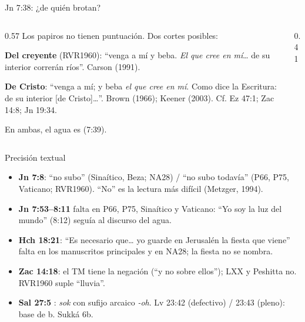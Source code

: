 \begin{frame}{Jn 7:38: ¿de quién brotan?}
\begin{columns}[c,onlytextwidth]
\begin{column}{0.57\textwidth}\scriptsize
Los papiros no tienen puntuación. Dos cortes posibles:\par\smallskip
\begin{tcolorbox}[colback=papiro,colframe=tierraroja!60,boxrule=0.6pt,arc=2pt,left=3pt,right=3pt,top=2pt,bottom=2pt]
\textbf{Del creyente} (RVR1960): ``venga a mí y beba. \emph{El que cree en mí}\ldots{} de su interior correrán ríos''. Carson (1991).
\end{tcolorbox}
\begin{tcolorbox}[colback=papiro,colframe=tierraroja!60,boxrule=0.6pt,arc=2pt,left=3pt,right=3pt,top=2pt,bottom=2pt]
\textbf{De Cristo}: ``venga a mí; y beba \emph{el que cree en mí}. Como dice la Escritura: de su interior [de Cristo]\ldots''. Brown (1966); Keener (2003). Cf. Ez 47:1; Zac 14:8; Jn 19:34.
\end{tcolorbox}
En ambas, el agua es  (7:39).
\end{column}
\begin{column}{0.41\textwidth}\end{column}
\end{columns}
\end{frame}

\begin{frame}{Precisión textual}
\small
\begin{itemize}
\item \textbf{Jn 7:8}:  ``no subo'' (Sinaítico, Beza; NA28) /  ``no subo todavía'' (P66, P75, Vaticano; RVR1960). ``No'' es la lectura más difícil (Metzger, 1994).
\item \textbf{Jn 7:53--8:11} falta en P66, P75, Sinaítico y Vaticano: ``Yo soy la luz del mundo'' (8:12) seguía al discurso del agua.
\item \textbf{Hch 18:21}: ``Es necesario que\ldots{} yo guarde en Jerusalén la fiesta que viene'' falta en los manuscritos principales y en NA28; la fiesta no se nombra.
\item \textbf{Zac 14:18}: el TM tiene la negación (``y no sobre ellos''); LXX y Peshitta no. RVR1960 suple ``lluvia''.
\item \textbf{Sal 27:5} : \emph{sok} con sufijo arcaico \emph{-oh}. Lv 23:42  (defectivo) / 23:43  (pleno): base de b. Sukká 6b.
\end{itemize}
\end{frame}

